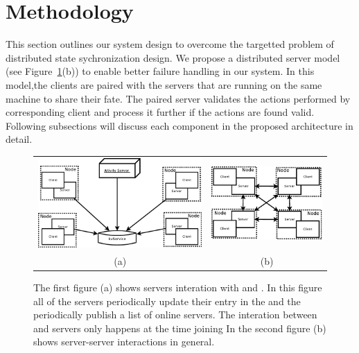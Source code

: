 
\section{Methodology}
\label{sec:methodology}

	This section outlines our system design to overcome the targetted problem of distributed state sychronization design. We propose a distributed server model (see Figure~\ref{figure:server-models}(b)) to enable better failure handling in our system. In this model,the clients are paired with the servers that are running on the same machine to share their fate. The paired server validates the actions performed by corresponding client and process it further if the actions are found valid. Following subsections will discuss each component in the proposed architecture in detail.

\begin{figure}[ht]
	\centering
	\begin{tabular}{c c}
		
		\includegraphics[width=0.52\linewidth]{../images/client-distributed-server-model-Activity-crop.pdf} &
		\includegraphics[width=0.40\linewidth]{../images/client-distributed-server-model-crop.pdf} \\
		(a) & (b)
	\end{tabular}
	
	\caption{\label{figure:server-models} The first figure (a) shows servers interation with \activityServer and \kvService. In this figure all of the servers periodically update their entry in the \kvService and the \activityServer periodically publish a list of online servers. The interation between \activityServer and servers only happens at the time joining In the second figure (b) shows server-server interactions in general.}
\end{figure}


